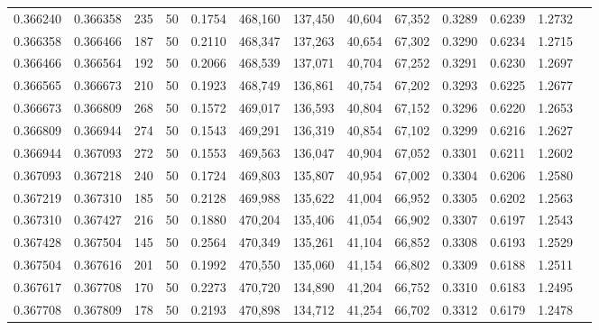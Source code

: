 \begin{tabular}{rrrrrrrrrrrrr}
0.366240 & 0.366358 &   235 &  50 &                                     0.1754 & 468,160 & 137,450 &  40,604 &  67,352 & 0.3289 & 0.6239 & 1.2732 \\
0.366358 & 0.366466 &   187 &  50 &                                     0.2110 & 468,347 & 137,263 &  40,654 &  67,302 & 0.3290 & 0.6234 & 1.2715 \\
0.366466 & 0.366564 &   192 &  50 &                                     0.2066 & 468,539 & 137,071 &  40,704 &  67,252 & 0.3291 & 0.6230 & 1.2697 \\
0.366565 & 0.366673 &   210 &  50 &                                     0.1923 & 468,749 & 136,861 &  40,754 &  67,202 & 0.3293 & 0.6225 & 1.2677 \\
0.366673 & 0.366809 &   268 &  50 &                                     0.1572 & 469,017 & 136,593 &  40,804 &  67,152 & 0.3296 & 0.6220 & 1.2653 \\
0.366809 & 0.366944 &   274 &  50 &                                     0.1543 & 469,291 & 136,319 &  40,854 &  67,102 & 0.3299 & 0.6216 & 1.2627 \\
0.366944 & 0.367093 &   272 &  50 &                                     0.1553 & 469,563 & 136,047 &  40,904 &  67,052 & 0.3301 & 0.6211 & 1.2602 \\
0.367093 & 0.367218 &   240 &  50 &                                     0.1724 & 469,803 & 135,807 &  40,954 &  67,002 & 0.3304 & 0.6206 & 1.2580 \\
0.367219 & 0.367310 &   185 &  50 &                                     0.2128 & 469,988 & 135,622 &  41,004 &  66,952 & 0.3305 & 0.6202 & 1.2563 \\
0.367310 & 0.367427 &   216 &  50 &                                     0.1880 & 470,204 & 135,406 &  41,054 &  66,902 & 0.3307 & 0.6197 & 1.2543 \\
0.367428 & 0.367504 &   145 &  50 &                                     0.2564 & 470,349 & 135,261 &  41,104 &  66,852 & 0.3308 & 0.6193 & 1.2529 \\
0.367504 & 0.367616 &   201 &  50 &                                     0.1992 & 470,550 & 135,060 &  41,154 &  66,802 & 0.3309 & 0.6188 & 1.2511 \\
0.367617 & 0.367708 &   170 &  50 &                                     0.2273 & 470,720 & 134,890 &  41,204 &  66,752 & 0.3310 & 0.6183 & 1.2495 \\
0.367708 & 0.367809 &   178 &  50 &                                     0.2193 & 470,898 & 134,712 &  41,254 &  66,702 & 0.3312 & 0.6179 & 1.2478 \\

\end{tabular}
